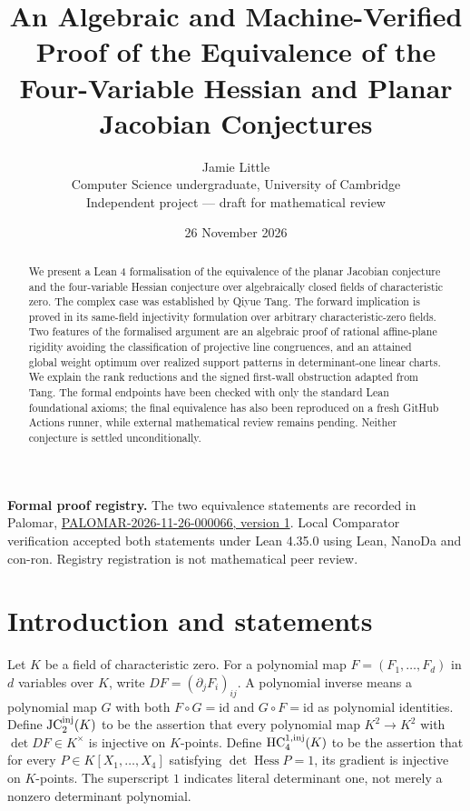 \documentclass[11pt,a4paper]{article}
\title{An Algebraic and Machine-Verified Proof of the Equivalence of the Four-Variable Hessian and Planar Jacobian Conjectures}
\author{Jamie Little\\
\small Computer Science undergraduate, University of Cambridge\\
\small Independent project --- draft for mathematical review}
\date{26 November 2026}
\newcommand{\Hess}{\operatorname{Hess}}
\begin{document}
\maketitle
\begin{abstract}
We present a Lean 4 formalisation of the equivalence of the planar Jacobian conjecture and the four-variable Hessian conjecture over algebraically closed fields of characteristic zero. The complex case was established by Qiyue Tang. The forward implication is proved in its same-field injectivity formulation over arbitrary characteristic-zero fields. Two features of the formalised argument are an algebraic proof of rational affine-plane rigidity avoiding the classification of projective line congruences, and an attained global weight optimum over realized support patterns in determinant-one linear charts. We explain the rank reductions and the signed first-wall obstruction adapted from Tang. The formal endpoints have been checked with only the standard Lean foundational axioms; the final equivalence has also been reproduced on a fresh GitHub Actions runner, while external mathematical review remains pending. Neither conjecture is settled unconditionally.
\end{abstract}

\noindent\textbf{Formal proof registry.} The two equivalence statements are recorded in Palomar, \href{https://palomar-registry.org/entry.html?id=PALOMAR-2026-11-26-000066\&version=1}{PALOMAR-2026-11-26-000066, version 1}. Local Comparator verification accepted both statements under Lean 4.35.0 using Lean, NanoDa and con-ron. Registry registration is not mathematical peer review.

\section{Introduction and statements}\label{sec:intro}
Let $K$ be a field of characteristic zero. For a polynomial map $F=(F_1,\ldots,F_d)$ in $d$ variables over $K$, write $DF=(\partial_jF_i)_{ij}$. A polynomial inverse means a polynomial map $G$ with both $F\circ G=\mathrm{id}$ and $G\circ F=\mathrm{id}$ as polynomial identities. Define $\mathrm{JC}_2^{\rm inj}(K)$ to be the assertion that every polynomial map $K^2\to K^2$ with $\det DF\in K^\times$ is injective on $K$-points. Define $\mathrm{HC}_4^{1,\rm inj}(K)$ to be the assertion that for every $P\in K[X_1,\ldots,X_4]$ satisfying $\det\Hess P=1$, its gradient is injective on $K$-points. The superscript $1$ indicates literal determinant one, not merely a nonzero determinant polynomial.
\end{document}
